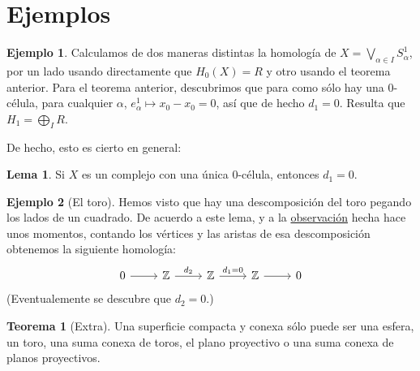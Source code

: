 \documentclass[spanish]{book}
\theoremstyle{definition}
\newtheorem*{lema}{Lema}
\newtheorem*{teo}{Teorema}
\newtheorem*{ejem}{Ejemplo}
\newcommand{\Z}{\mathbb{Z}}
\begin{document}
	\section{Ejemplos}
	\begin{ejem}
		Calculamos de dos maneras distintas la homología de $X=\bigvee_{\alpha\in I}S_\alpha^1$, por un lado usando directamente que $H_0(X)=R$ y otro usando el teorema anterior. Para el teorema anterior, descubrimos que para como sólo hay una 0-célula, para cualquier $\alpha$, $e_\alpha^1\mapsto x_0-x_0=0$, así que de hecho $d_1=0$. Resulta que $H_1=\bigoplus_IR$.
	\end{ejem}
	De hecho, esto es cierto en general:
	\begin{lema}
		Si $X$ es un complejo con una única 0-célula, entonces $d_1=0$.
	\end{lema}
	\begin{ejem}[El toro]
		Hemos visto que hay una descomposición del toro pegando los lados de un cuadrado. De acuerdo a este lema, y a la \hyperref[obs1]{observación} hecha hace unos momentos, contando los vértices y las aristas de esa descomposición obtenemos la siguiente homología:
		\[\begin{tikzcd}
			0\arrow[r]&\Z\arrow[r,"d_2"]&\Z\arrow[r,"d_1=0"]&\Z\arrow[r]&0
		\end{tikzcd}\]
		(Eventualemente se descubre que $d_2=0$.)
		
%			
	
	\end{ejem}
	\begin{teo}[Extra]
		Una superficie compacta y conexa sólo puede ser una esfera, un toro, una suma conexa de toros, el plano proyectivo o una suma conexa de planos proyectivos.
	\end{teo}
\end{document}
